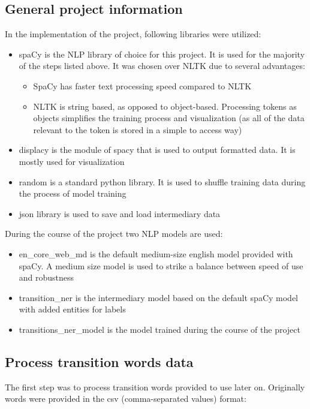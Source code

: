 \documentclass[conference]{IEEEtran}
\begin{document}
\subsection{General project information}
In the implementation of the project, following libraries were utilized:
\begin{itemize}
    \item spaCy is the NLP library of choice for this project. It is used for the majority of the steps listed above. It was chosen over NLTK due to several advantages:
    \begin{itemize}
        \item SpaCy has faster text processing speed compared to NLTK
        \item NLTK is string based, as opposed to object-based. Processing tokens as objects simplifies the training process and visualization (as all of the data relevant to the token is stored in a simple to access way)
    \end{itemize}
    \item displacy is the module of spacy that is used to output formatted data. It is mostly used for visualization
    \item random is a standard python library. It is used to shuffle training data during the process of model training
    \item json library is used to save and load intermediary data
\end{itemize}

During the course of the project two NLP models are used:
\begin{itemize}
    \item en\_core\_web\_md is the default medium-size english model provided with spaCy. A medium size model is used to strike a balance between speed of use and robustness
    \item transition\_ner is the intermediary model based on the default spaCy model with added entities for labels
    \item transitions\_ner\_model is the model trained during the course of the project
\end{itemize}

\subsection{Process transition words data}
The first step was to process transition words provided to use later on. Originally words were provided in the csv (comma-separated values) format:
\end{document}

